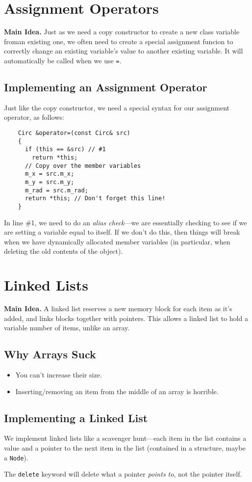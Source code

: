 \documentclass[class=article, crop=false]{standalone}
\begin{document}
  \section{Assignment Operators}
  \textbf{Main Idea.} Just as we need a copy constructor to create a new class variable froman existing one, we often need to create a special assignment funcion to correctly change an existing variable's value to another existing variable. It will automatically be called when we use \texttt{=}.
  \subsection{Implementing an Assignment Operator}
  Just like the copy constructor, we need a special syntax for our assignment operator, as follows:
  \begin{lstlisting}
    Circ &operator=(const Circ& src)
    {
      if (this == &src) // #1
        return *this;
      // Copy over the member variables
      m_x = src.m_x;
      m_y = src.m_y;
      m_rad = src.m_rad;
      return *this; // Don't forget this line!
    }
  \end{lstlisting}
  In line \#1, we need to do an \emph{alias check}---we are essentially checking to see if we are setting a variable equal to itself. If we don't do this, then things will break when we have dynamically allocated member variables (in particular, when deleting the old contents of the object).
  \section{Linked Lists}
  \textbf{Main Idea.} A linked list reserves a new memory block for each item as it's added, and links blocks together with pointers. This allows a linked list to hold a variable number of items, unlike an array.
  \subsection{Why Arrays Suck}
  \begin{itemize}
    \item You can't increase their size.
    \item Inserting/removing an item from the middle of an array is horrible.
  \end{itemize}
  \subsection{Implementing a Linked List}
  We implement linked lists like a scavenger hunt---each item in the list contains a value and a pointer to the next item in the list (contained in a structure, maybe a \texttt{Node}).
  \begin{note}{}
    The \texttt{delete} keyword will delete what a pointer \emph{points to}, not the pointer itself.
  \end{note}
\end{document}
